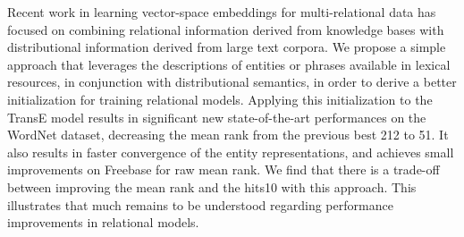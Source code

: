 Recent work in learning vector-space embeddings for multi-relational data has focused on combining relational information derived from knowledge bases with distributional information derived from large text corpora. We propose a simple approach that leverages the descriptions of entities or phrases available in lexical resources, in conjunction with distributional semantics, in order to derive a better initialization for training relational models. Applying this initialization to the TransE model results in significant new state-of-the-art performances on the WordNet dataset, decreasing the mean rank from the previous best 212 to 51. It also results in faster convergence of the entity representations, and achieves small improvements on Freebase for raw mean rank. We find that there is a trade-off between improving the mean rank and the hits\@10 with this approach. This illustrates that much remains to be understood regarding performance improvements in relational models.
